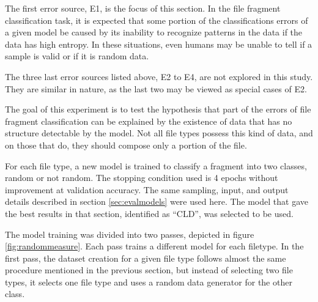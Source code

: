 The first error source, E1, is the focus of this section. In the file fragment classification task, it is expected that some portion of the classifications errors of a given model be caused by its inability to recognize patterns in the data if the data has high entropy. In these situations, even humans may be unable to tell if a sample is valid or if it is random data.

The three last error sources listed above, E2 to E4, are not explored in this study. They are similar in nature, as the last two may be viewed as special cases of E2. 

The goal of this experiment is to test the hypothesis that part of the errors of file fragment classification  can be explained by the existence of data that has no structure detectable by the model. Not all file types possess this kind of data, and on those that do, they should compose only a portion of the file.


For each file type, a new model is trained to classify a fragment into two classes, random or not random. The stopping condition used is 4 epochs without improvement at validation accuracy.
The same sampling, input, and output details described in section \ref{sec:evalmodels} were used here. The model that gave the best results in that section, identified as ``CLD'', was selected to be used.


The model training was divided into two passes, depicted in figure \ref{fig:randommeasure}. Each pass trains a different model for each filetype. In the first pass, the dataset creation for a given file type follows almost the same procedure mentioned in the previous section, but instead of selecting two file types, it selects one file type and uses a random data generator for the other class.

